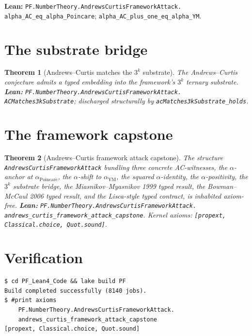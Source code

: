 \documentclass[11pt,a4paper]{article}
\theoremstyle{plain}
\newtheorem{theorem}{Theorem}[section]
\theoremstyle{definition}
\begin{document}
\textbf{Lean:}
\texttt{PF.NumberTheory.AndrewsCurtisFrameworkAttack.\\
alpha\_AC\_eq\_alpha\_Poincare};
\texttt{alpha\_AC\_plus\_one\_eq\_alpha\_YM}.

\section{The substrate bridge}

\begin{theorem}[Andrews--Curtis matches the $3^{k}$ substrate]
\label{thm:ac-substrate}
The Andrews--Curtis conjecture admits a typed embedding into the
framework's $3^{k}$ ternary substrate.
\textbf{Lean:}
\texttt{PF.NumberTheory.AndrewsCurtisFrameworkAttack.\\
ACMatches3kSubstrate};
discharged structurally by
\texttt{acMatches3kSubstrate\_holds}.
\end{theorem}

\section{The framework capstone}

\begin{theorem}[Andrews--Curtis framework attack capstone]
\label{thm:ac-capstone}
The structure
\texttt{AndrewsCurtisFrameworkAttack} bundling three concrete
AC-witnesses, the $\alpha$-anchor at $\alpha_{\mathrm{Poincar\acute e}}$,
the $\alpha$-shift to $\alpha_{\mathrm{YM}}$, the squared
$\alpha$-identity, the $\alpha$-positivity, the $3^{k}$ substrate
bridge, the Miasnikov--Myasnikov 1999 typed result, the
Bowman--McCaul 2006 typed result, and the Lisca-style typed
contract, is inhabited axiom-free.
\textbf{Lean:}
\texttt{PF.NumberTheory.AndrewsCurtisFrameworkAttack.\\
andrews\_curtis\_framework\_attack\_capstone}.
Kernel axioms: \texttt{[propext, Classical.choice, Quot.sound]}.
\end{theorem}

\section{Verification}

\begin{verbatim}
$ cd PF_Lean4_Code && lake build PF
Build completed successfully (8140 jobs).
$ #print axioms
    PF.NumberTheory.AndrewsCurtisFrameworkAttack.
    andrews_curtis_framework_attack_capstone
[propext, Classical.choice, Quot.sound]
\end{verbatim}
\end{document}
